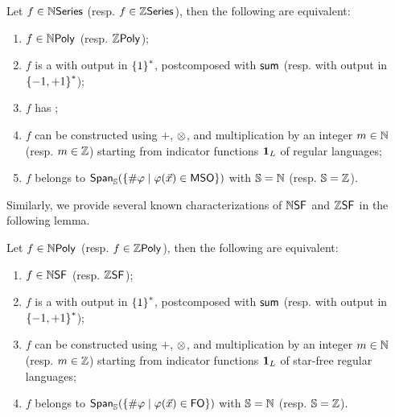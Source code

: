 \begin{lemma}[TODO]
    \label{polynomial-rational-polyreg:fact}
    Let $f \in \mathbb{N}\mathsf{Series}$ (resp. $f \in \mathbb{Z}\mathsf{Series}$), then
    the following are equivalent:
    \begin{enumerate}
        \item $f \in \NPoly$ (resp. $\ZPoly$);
        \item $f$ is a  with output
            in $\mathopen{\{} 1 \mathclose{\}}^*$,
            postcomposed with $\mathsf{sum}$
            (resp. with output in $\mathopen{\{} -1,+1 \mathclose{\}}^*$);
        \item $f$ has ;
        \item $f$ can be constructed
            using $+$, $\mathrel{\otimes}$, and multiplication by
            an integer $m \in \mathbb{N}$ (resp. $m \in \mathbb{Z}$)
            starting from
            indicator functions $\mathbf{1}_{L}$ of regular languages;
        \item $f$ belongs to
            $\mathop{\mathsf{Span}_{\mathbb{S}}}(\mathopen{\{} {{\#}\varphi} \mid \varphi(\vec{x}) \in \mathsf{MSO} \mathclose{\}})$
            with $\mathbb{S} = \mathbb{N}$
            (resp. $\mathbb{S} = \mathbb{Z}$).
    \end{enumerate}
\end{lemma}

Similarly, we provide several known characterizations of
$\NSF$ and $\ZSF$ in the following lemma.

\begin{lemma}[TODO]
    Let $f \in \NPoly$ (resp. $f \in \ZPoly$), then
    the following are equivalent:
    \begin{enumerate}
        \item $f \in \NSF$ (resp. $\ZSF$);
        \item $f$ is a  with output
            in $\mathopen{\{} 1 \mathclose{\}}^*$,
            postcomposed with $\mathsf{sum}$
            (resp. with output in $\mathopen{\{} -1,+1 \mathclose{\}}^*$);
        \item $f$ can be constructed
            using $+$, $\mathrel{\otimes}$, and multiplication by
            an integer $m \in \mathbb{N}$ (resp. $m \in \mathbb{Z}$)
            starting from
            indicator functions $\mathbf{1}_{L}$ of star-free regular languages;
        \item $f$ belongs to
            $\mathop{\mathsf{Span}_{\mathbb{S}}}(\mathopen{\{} {{\#}\varphi} \mid \varphi(\vec{x}) \in \mathsf{FO} \mathclose{\}})$
            with $\mathbb{S} = \mathbb{N}$
            (resp. $\mathbb{S} = \mathbb{Z}$).
    \end{enumerate}
\end{lemma}

